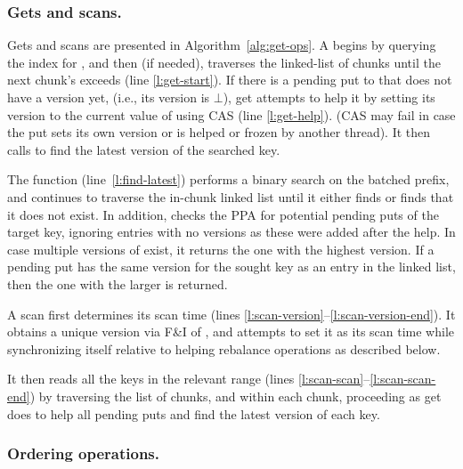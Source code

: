 \subsubsection{Gets and scans.}

Gets and scans are presented in Algorithm~\ref{alg:get-ops}.
A  begins by querying the index for , and then (if needed), traverses the linked-list of chunks until
the next chunk's  exceeds  (line \ref{l:get-start}).
If there is a pending put to  that does not have a version yet, (i.e., its version is $\bot$), get attempts to help it by setting its version to
the current value of  using CAS  (line \ref{l:get-help}). (CAS may fail in case the put sets its own version or is helped or frozen by another thread).
It then calls   to find the latest version of the searched key.

The  function (line~\ref{l:find-latest}) performs a binary search on the batched prefix, and continues to traverse the in-chunk linked list until it either finds   or finds that it does not exist. In addition,  checks the PPA for potential pending puts of the target key,
ignoring entries with no versions as these were added after the help.
In case multiple versions of  exist, it returns the one with the highest version.
If a pending put has the same version for the sought key as an entry in the linked list, then the one with the larger  is returned.

A scan first determines its scan time  (lines \ref{l:scan-version}--\ref{l:scan-version-end}).  It obtains a  unique version via F\&I of ,
and attempts to set it as its scan time while synchronizing itself relative to helping rebalance operations
as described below.

It then reads all the keys in the relevant range (lines \ref{l:scan-scan}--\ref{l:scan-scan-end})
by traversing the list of chunks, and within each chunk, proceeding as get does to help all pending puts and find the latest version of each key.

\subsubsection{Ordering operations.}



